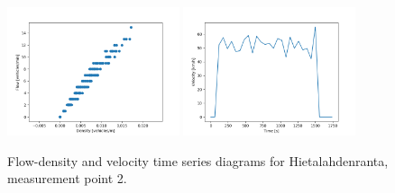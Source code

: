 \documentclass[english, 12pt, a4paper, elec, utf8, pdfa, online]{aaltothesis}
\begin{document}
\begin{figure}[ht!]
    \centering
    \includegraphics[width=0.45\textwidth]{graphs/Hietalahdenranta_2_flw_dns.png}
    \includegraphics[width=0.45\textwidth]{graphs/Hietalahdenranta_2_spd_time_6.png}
    \caption{Flow-density and velocity time series diagrams for Hietalahdenranta, measurement point 2.}
\end{figure}
\end{document}

